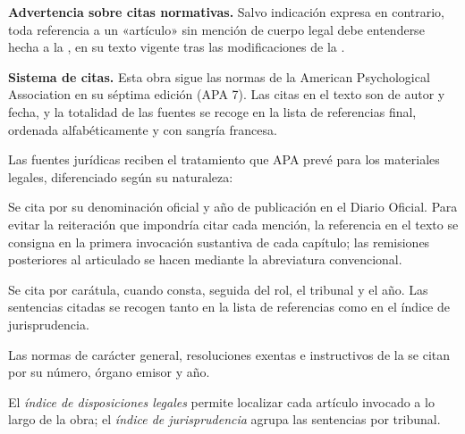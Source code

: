 \vspace{0.6cm}
\noindent\textbf{\sffamily Advertencia sobre citas normativas.}
Salvo indicación expresa en contrario, toda referencia a un «artículo» sin mención de
cuerpo legal debe entenderse hecha a la , en su texto vigente tras las modificaciones de la \Lreforma{}.

\vspace{0.8cm}
\noindent\textbf{\sffamily Sistema de citas.}
Esta obra sigue las normas de la American Psychological Association en su séptima
edición (APA 7). Las citas en el texto son de autor y fecha, y la totalidad de las
fuentes se recoge en la lista de referencias final, ordenada alfabéticamente y con
sangría francesa.

\vspace{6pt}
\noindent
Las fuentes jurídicas reciben el tratamiento que APA prevé para los materiales legales,
diferenciado según su naturaleza:

\vspace{4pt}
\begin{description}[leftmargin=0pt,style=nextline,font=\sffamily\bfseries,itemsep=3pt]
  \item[Legislación] Se cita por su denominación oficial y año de publicación en el
  Diario Oficial. Para evitar la reiteración que impondría citar cada mención, la
  referencia en el texto se consigna en la primera invocación sustantiva de cada capítulo;
  las remisiones posteriores al articulado se hacen mediante la abreviatura convencional.

  \item[Jurisprudencia] Se cita por carátula, cuando consta, seguida del rol, el tribunal
  y el año. Las sentencias citadas se recogen tanto en la lista de referencias como en el
  índice de jurisprudencia.

  \item[Normativa administrativa] Las normas de carácter general, resoluciones exentas e
  instructivos de la \Superir{} se citan por su número, órgano emisor y año.
\end{description}

\vspace{6pt}
\noindent
El \emph{índice de disposiciones legales} permite localizar cada artículo invocado a lo
largo de la obra; el \emph{índice de jurisprudencia} agrupa las sentencias por tribunal.

\cleardoublepage
